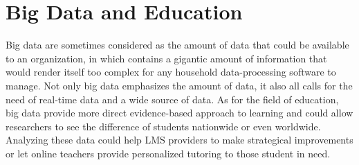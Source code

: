 \documentclass[sigconf]{acmart}
\begin{document}
\section{Big Data and Education}
Big data are sometimes considered as the amount of data that could be available to an organization, in which contains a gigantic amount of information that would render itself too complex for any household data-processing software to manage. Not only big data emphasizes the amount of data, it also all calls for the need of real-time data and a wide source of data. As for the field of education, big data provide more direct evidence-based approach to learning and could allow researchers to see the difference of students nationwide or even worldwide. Analyzing these data could help LMS providers to make strategical improvements or let online teachers provide personalized tutoring to those student in need. \cite{Anderson2008}
\end{document}
